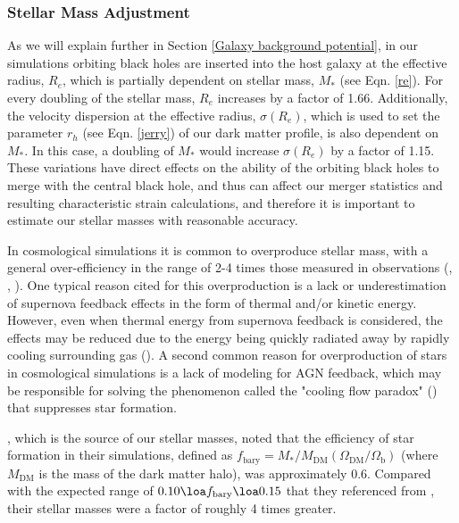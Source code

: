 \documentclass[fleqn,usenatbib,useAMS]{mnras}
\begin{document}
\subsubsection{Stellar Mass Adjustment}
As we will explain further in Section \ref{Galaxy background potential}, in our simulations orbiting black holes are inserted into the host galaxy at the effective radius, $R_e$, which is partially dependent on stellar mass, $M_*$ (see Eqn. \ref{re}).  For every doubling of the stellar mass, $R_e$ increases by a factor of 1.66.  Additionally, the velocity dispersion at the effective radius, $\sigma(R_e)$, which is used to set the parameter $r_h$ (see Eqn. \ref{jerry}) of our dark matter profile, is also dependent on $M_*$.  In this case, a doubling of $M_*$ would increase $\sigma(R_e)$ by a factor of 1.15.  These variations have direct effects on the ability of the orbiting black holes to merge with the central black hole, and thus can affect our merger statistics and resulting characteristic strain calculations, and therefore it is important to estimate our stellar masses with reasonable accuracy.

In cosmological simulations it is common to overproduce stellar mass, with a general over-efficiency in the range of 2-4 times those measured in observations (\citet{1996ApJS..105...19K}, \citet{2010MNRAS.404.1111G}, \citet{2010ApJ...725.2312O}).  One typical reason cited for this overproduction is a lack or underestimation of supernova feedback effects in the form of thermal and/or kinetic energy.  However, even when thermal energy from supernova feedback is considered, the effects may be reduced due to the energy being quickly radiated away by rapidly cooling surrounding gas (\citet{1996ApJS..105...19K}).  A second common reason for overproduction of stars in cosmological simulations is a lack of modeling for AGN feedback, which may be responsible for solving the phenomenon called the "cooling flow paradox" (\citet{2001MNRAS.321L..20F}) that suppresses star formation. 

\citet{2012MNRAS.425..641L}, which is the source of our stellar masses, noted that the efficiency of star formation in their simulations, defined as $f_\mathrm{bary}=M_*/M_{\mathrm{DM}}(\Omega_\mathrm{DM}/\Omega_\mathrm{b})$ (where $M_\mathrm{DM}$ is the mass of the dark matter halo), was approximately 0.6.  Compared with the expected range of $0.10 \loa f_\mathrm{bary} \loa 0.15$ that they referenced from \citet{2012ApJ...746...95L}, their stellar masses were a factor of roughly 4 times greater.
\end{document}
